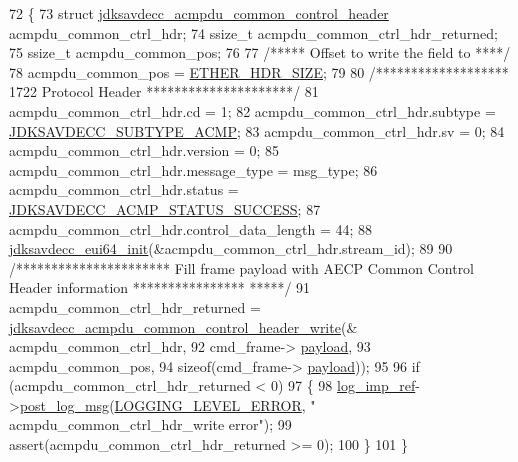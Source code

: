 \begin{DoxyCode}
72 \{
73     \textcolor{keyword}{struct }\hyperlink{structjdksavdecc__acmpdu__common__control__header}{jdksavdecc\_acmpdu\_common\_control\_header} 
      acmpdu\_common\_ctrl\_hdr;
74     ssize\_t acmpdu\_common\_ctrl\_hdr\_returned;
75     ssize\_t acmpdu\_common\_pos;
76 
77     \textcolor{comment}{/***** Offset to write the field to ****/}
78     acmpdu\_common\_pos = \hyperlink{namespaceavdecc__lib_a6c827b1a0d973e18119c5e3da518e65ca9512ad9b34302ba7048d88197e0a2dc0}{ETHER\_HDR\_SIZE};
79 
80     \textcolor{comment}{/******************* 1722 Protocol Header *********************/}
81     acmpdu\_common\_ctrl\_hdr.cd = 1;
82     acmpdu\_common\_ctrl\_hdr.subtype = \hyperlink{group__subtype_gadcdd50d34325df28c29ca6249a4c307e}{JDKSAVDECC\_SUBTYPE\_ACMP};
83     acmpdu\_common\_ctrl\_hdr.sv = 0;
84     acmpdu\_common\_ctrl\_hdr.version = 0;
85     acmpdu\_common\_ctrl\_hdr.message\_type = msg\_type;
86     acmpdu\_common\_ctrl\_hdr.status = \hyperlink{group__acmp__status_gaf66306114de2faa8476897fec5d21cd8}{JDKSAVDECC\_ACMP\_STATUS\_SUCCESS};
87     acmpdu\_common\_ctrl\_hdr.control\_data\_length = 44;
88     \hyperlink{group__eui64_ga6eda4ed21b6f0d526b180ac633eeba69}{jdksavdecc\_eui64\_init}(&acmpdu\_common\_ctrl\_hdr.stream\_id);
89 
90     \textcolor{comment}{/********************** Fill frame payload with AECP Common Control Header information ****************
      *****/}
91     acmpdu\_common\_ctrl\_hdr\_returned = 
      \hyperlink{group__acmpdu_gac16d3a1b77049d801599ad8887570a42}{jdksavdecc\_acmpdu\_common\_control\_header\_write}(&
      acmpdu\_common\_ctrl\_hdr,
92                                                                                     cmd\_frame->
      \hyperlink{structjdksavdecc__frame_a220ad076814a31ae0163e722e523de46}{payload},
93                                                                                     acmpdu\_common\_pos,
94                                                                                     \textcolor{keyword}{sizeof}(cmd\_frame->
      \hyperlink{structjdksavdecc__frame_a220ad076814a31ae0163e722e523de46}{payload}));
95 
96     \textcolor{keywordflow}{if} (acmpdu\_common\_ctrl\_hdr\_returned < 0)
97     \{
98         \hyperlink{namespaceavdecc__lib_acbe3e2a96ae6524943ca532c87a28529}{log\_imp\_ref}->\hyperlink{classavdecc__lib_1_1log_a68139a6297697e4ccebf36ccfd02e44a}{post\_log\_msg}(\hyperlink{namespaceavdecc__lib_a501055c431e6872ef46f252ad13f85cdaf2c4481208273451a6f5c7bb9770ec8a}{LOGGING\_LEVEL\_ERROR}, \textcolor{stringliteral}{"
      acmpdu\_common\_ctrl\_hdr\_write error"});
99         assert(acmpdu\_common\_ctrl\_hdr\_returned >= 0);
100     \}
101 \}
\end{DoxyCode}


